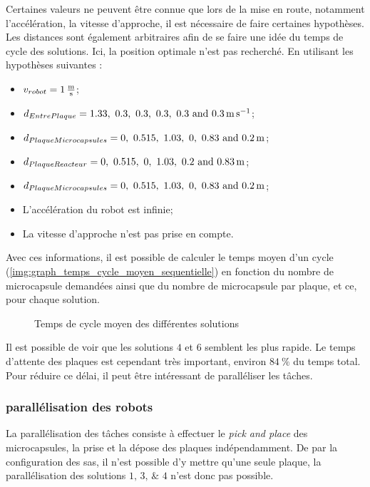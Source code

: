 Certaines valeurs ne peuvent être connue que lors de la mise en route, notamment l'accélération, la vitesse d'approche, il est nécessaire de faire certaines hypothèses. Les distances sont également arbitraires afin de se faire une idée du temps de cycle des solutions. Ici, la position optimale n'est pas recherché.
En utilisant les hypothèses suivantes :
\begin{itemize}
    \item $v_{robot} = \qty{1}{\frac{\m}{\s}}$;
    \item $d_{EntrePlaque} = \qtylist[list-units = single]{1.33; 0.3; 0.3; 0.3; 0.3; 0.3}{\m\per\s}$;
    \item $d_{PlaqueMicrocapsules} = \qtylist[list-units = single]{0; 0.515; 1.03; 0; 0.83; 0.2 }{\m}$;
    \item $d_{PlaqueReacteur} =      \qtylist[list-units = single]{0; 0.515; 0; 1.03; 0.2; 0.83 }{\m}$;
    \item $d_{PlaqueMicrocapsules} = \qtylist[list-units = single]{0; 0.515; 1.03; 0; 0.83; 0.2 }{\m}$;
    \item L'accélération du robot est infinie;
    \item La vitesse d'approche n'est pas prise en compte.
\end{itemize}
Avec ces informations, il est possible de calculer le temps moyen d'un cycle (\cf \autoref{img:graph_temps_cycle_moyen_sequentielle}) en fonction du nombre de microcapsule demandées ainsi que du nombre de microcapsule par plaque, et ce, pour chaque solution.
\begin{figure}[H]
    \centering
    
    \caption{Temps de cycle moyen des différentes solutions}
    \label{img:graph_temps_cycle_moyen_sequentielle}
\end{figure}
Il est possible de voir que les solutions $4$ et $6$ semblent les plus rapide. Le temps d'attente des plaques est cependant très important, environ $84~\%$ du temps total. Pour réduire ce délai, il peut être intéressant de paralléliser les tâches.
\subsubsection{parallélisation des robots}
La parallélisation des tâches consiste à effectuer le \textit{pick and place} des microcapsules, la prise et la dépose des plaques indépendamment.
De par la configuration des sas, il n'est possible d'y mettre qu'une seule plaque, la parallélisation des solutions $\numlist{1; 3; 4}$ n'est donc pas possible.


